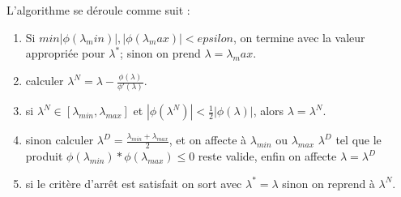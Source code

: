 \documentclass[a4paper,12pt]{article}
\theoremstyle{break}
\begin{document}
L'algorithme se déroule comme suit :\\
\begin{enumerate}
	\item Si $min {|\phi(\lambda_min)|, |\phi(\lambda_max)|} < epsilon$, on termine avec la valeur appropriée pour $\lambda^*$; sinon on prend $\lambda = \lambda_max$.
	\item calculer $\lambda^N = \lambda - \frac{\phi(\lambda)}{\phi'(\lambda)}$.
	\item si $\lambda^N \in [\lambda_{min}, \lambda_{max}]$ et $|\phi(\lambda^N)| < \frac{1}{2} |\phi(\lambda)|$, alors $\lambda = \lambda^N$.
	\item sinon calculer $\lambda^D = \frac{\lambda_{min} + \lambda_{max}}{2}$, et on affecte à $\lambda_{min}$ ou $\lambda_{max}$ $\lambda^D$ tel que le produit $\phi(\lambda_{min})*\phi(\lambda_{max}) \leq 0$ reste valide, enfin on affecte $\lambda = \lambda^D$
	\item si le critère d'arrêt est satisfait on sort avec $\lambda^* = \lambda$ sinon on reprend à $\lambda^N$.
\end{enumerate}

\newpage
\end{document}
